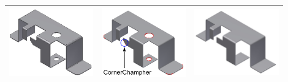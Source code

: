 \begin{minipage}[t]{\linewidth}
\begin{tabular}[h]{@{} p{0.3\linewidth} | p{0.3\linewidth} |  p{0.3\linewidth}@{}}
\includegraphics[width=0.98\linewidth]{..//Common/images/DefeatPhase_I_3} &
\includegraphics[width=0.92\linewidth]{..//Common/images/DefeatPhase_II_2_new_nolables.pdf} &
\includegraphics[width=0.98\linewidth]{..//Common/images/DefeatPhase_II_3} \\ \bottomrule


\end{tabular}
\end{minipage}
